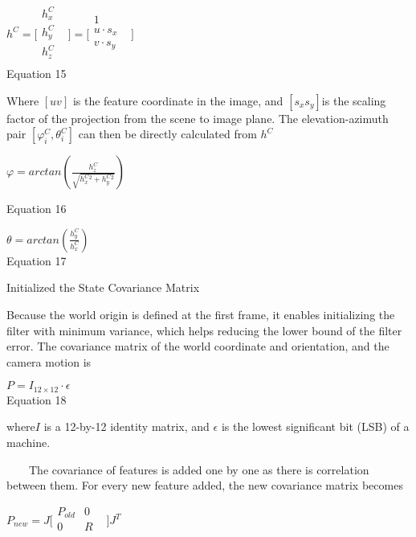 $h^{C}=\lbrack \begin{matrix}
h_{x}^{C} & \\
h_{y}^{C} & \\
h_{z}^{C} & \\
\end{matrix}
\rbrack =\lbrack \begin{matrix}
1 & \\
u\cdot s_{x} & \\
v\cdot s_{y} & \\
\end{matrix}
\rbrack $\\


Equation 15

Where $[u v]$ is the feature coordinate in the image, and $
[s_{x}s_{y}] $is the scaling factor of the projection from the scene to 
image plane. The elevation-azimuth pair $[\varphi _{i}^{C}, \theta 
_{i}^{C}]$ can then be directly calculated from $h^{C}$

\begin{center}$\varphi 
=arctan(\frac{h_{z}^{C}}{\sqrt{h_{x}^{C}^{2}+h_{y}^{C}^{2}}})$\\
\end{center}

Equation 16

$\theta =arctan(\frac{h_{y}^{C}}{h_{x}^{C}})$\\


Equation 17

Initialized the State Covariance Matrix

Because the world origin is defined at the first frame, it enables 
initializing the filter with minimum variance, which helps reducing the 
lower bound of the filter error. The covariance matrix of the world 
coordinate and orientation, and the camera motion is 

$P=I_{12\times 12}\cdot \epsilon $\\


Equation 18

where$I$ is a 12-by-12 identity matrix, and $\epsilon $ is the 
lowest significant bit (LSB) of a machine.

\ \ \ \ The covariance of features is added one by one as there is 
correlation between them. For every new feature added, the new 
covariance matrix becomes

$P_{new}=J\lbrack \begin{matrix}
P_{old} & 0 & \\
0 & R & \\
\end{matrix}
\rbrack J^{T}$\\


